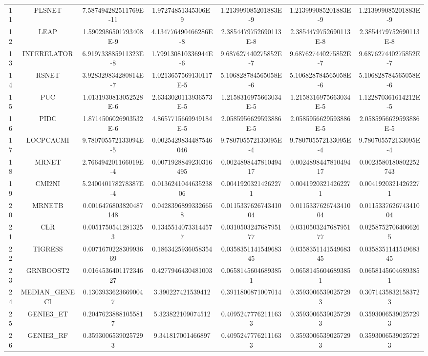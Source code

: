 \documentclass[a4paper,10pt]{article}
\begin{document}
\begin{landscape}
\begin{table}[!htp]
\begin{tabular}{ccccccc}
11&PLSNET&7.587494282511769E-11&1.97274851345306E-9&1.213999085201883E-9&1.213999085201883E-9&1.213999085201883E-9\\
12&LEAP&1.5902986501793408E-9&4.134776490466286E-8&2.3854479752690113E-8&2.3854479752690113E-8&2.3854479752690113E-8\\
13&INFERELATOR&6.919733885911323E-8&1.799130810336944E-6&9.687627440275852E-7&9.687627440275852E-7&9.687627440275852E-7\\
14&RSNET&3.928329834280814E-7&1.0213657569130117E-5&5.106828784565058E-6&5.106828784565058E-6&5.106828784565058E-6\\
15&PUC&1.0131930813052528E-6&2.6343020113936573E-5&1.2158316975663034E-5&1.2158316975663034E-5&1.122870361614212E-5\\
16&PIDC&1.8714506026903532E-6&4.8657715669949184E-5&2.0585956629593886E-5&2.0585956629593886E-5&2.0585956629593886E-5\\
17&LOCPCACMI&9.780705572133094E-5&0.0025429834487546046&9.780705572133095E-4&9.780705572133095E-4&9.780705572133095E-4\\
18&MRNET&2.766494201166019E-4&0.0071928849230316495&0.002489844781049417&0.002489844781049417&0.0023580180802252743\\
19&CMI2NI&5.240040178278387E-4&0.013624104463523806&0.00419203214262271&0.00419203214262271&0.00419203214262271\\
20&MRNETB&0.0016476803820487148&0.04283968993326658&0.011533762674341004&0.011533762674341004&0.011533762674341004\\
21&CLR&0.00517505412813253&0.13455140733144577&0.031050324768795177&0.031050324768795177&0.02587527064066265\\
22&TIGRESS&0.007167022830993669&0.1863425936058354&0.035835114154968345&0.035835114154968345&0.035835114154968345\\
23&GRNBOOST2&0.016453640117234627&0.4277946430481003&0.06581456046893851&0.06581456046893851&0.06581456046893851\\
24&MEDIAN_GENECI&0.13039336236690047&3.390227421539412&0.3911800871007014&0.35930065390257293&0.30714358321583723\\
25&GENIE3_ET&0.20476238881055817&5.323822109074512&0.40952477762111633&0.35930065390257293&0.35930065390257293\\
26&GENIE3_RF&0.35930065390257293&9.341817001466897&0.40952477762111633&0.35930065390257293&0.35930065390257293\\
\hline
\end{tabular}
\end{table}


\end{landscape}
\end{document}
